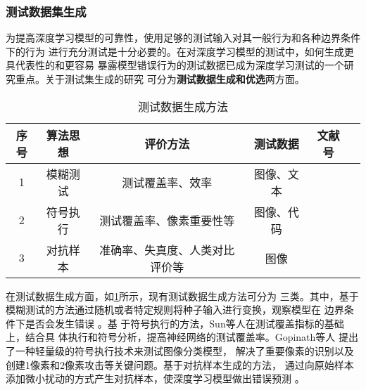


\subsubsection{测试数据集生成}

为提高深度学习模型的可靠性，使用足够的测试输入对其一般行为和各种边界条件下的行为
进行充分测试是十分必要的。在对深度学习模型的测试中，如何生成更具代表性的和更容易
暴露模型错误行为的测试数据已成为深度学习测试的一个研究重点。关于测试集生成的研究
可分为\textbf{测试数据生成和优选}两方面。


\begin{table}[htp]
	\renewcommand\arraystretch{1.5}
	\small
	\centering
	\caption{测试数据生成方法}
	\label{tab:testingDataGen}
	\begin{tabular}{cccccc}
		\toprule
		\textbf{序号} & \textbf{算法思想} & \textbf{评价方法}               & \textbf{测试数据} & \textbf{文献号}             \\
		\midrule
		1             & 模糊测试          & 测试覆盖率、效率 & 图像、文本 & \cite{Odena2019TensorFuzz}\cite{Guo2018DLFuzz}\cite{xie2019coverage} \\
		2             & 符号执行          & 测试覆盖率、像素重要性等                              & 图像、代码              & \cite{Gopinath2018Symbolic}\cite{Sun2018Concolic} \\
		3             & 对抗样本          & 准确率、失真度、人类对比评价等 & 图像 & \cite{Xiao2018Spatially}\cite{Wicker2018FeatureGuided}\cite{He2018Decision} \\
		\bottomrule
	\end{tabular}
\end{table}


在测试数据生成方面，如\cref{tab:testingDataGen}所示，现有测试数据生成方法可分为
三类。其中，基于模糊测试的方法通过随机或者特定规则将种子输入进行变换，观察模型在
边界条件下是否会发生错误
。基
于符号执行的方法，Sun等人在测试覆盖指标的基础上，结合具
体执行和符号分析，提高神经网络的测试覆盖率。Gopinath等人
提出了一种轻量级的符号执行技术来测试图像分类模型，
解决了重要像素的识别以及创建1像素和2像素攻击等关键问题。基于对抗样本生成的方法，
通过向原始样本添加微小扰动的方式产生对抗样本，使深度学习模型做出错误预测
。

